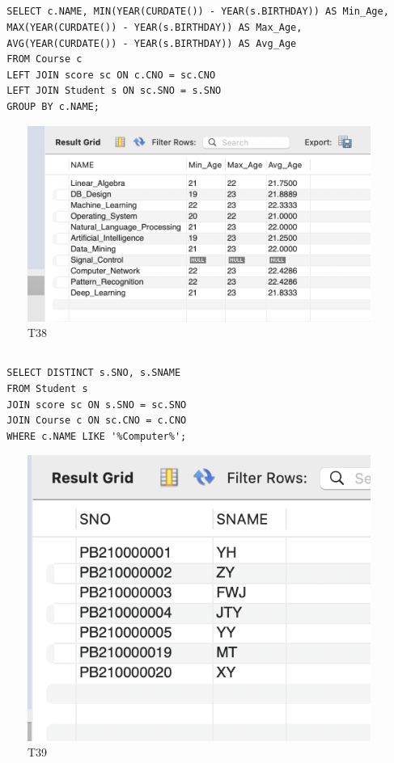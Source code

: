 \documentclass[UTF8]{ctexart}
\begin{document}
\subsection{}
\begin{lstlisting}
  SELECT c.NAME, MIN(YEAR(CURDATE()) - YEAR(s.BIRTHDAY)) AS Min_Age, 
  MAX(YEAR(CURDATE()) - YEAR(s.BIRTHDAY)) AS Max_Age, 
  AVG(YEAR(CURDATE()) - YEAR(s.BIRTHDAY)) AS Avg_Age
  FROM Course c
  LEFT JOIN score sc ON c.CNO = sc.CNO
  LEFT JOIN Student s ON sc.SNO = s.SNO
  GROUP BY c.NAME;
\end{lstlisting}
\begin{figure}[H]
  \centering
  \includegraphics[scale=0.7]{pics/38.png}
  \caption*{T38}
\end{figure}

\subsection{}
\begin{lstlisting}
  SELECT DISTINCT s.SNO, s.SNAME
  FROM Student s
  JOIN score sc ON s.SNO = sc.SNO
  JOIN Course c ON sc.CNO = c.CNO
  WHERE c.NAME LIKE '%Computer%';  
\end{lstlisting}
\begin{figure}[H]
  \centering
  \includegraphics[scale=0.7]{pics/39.png}
  \caption*{T39}
\end{figure}
\end{document}
